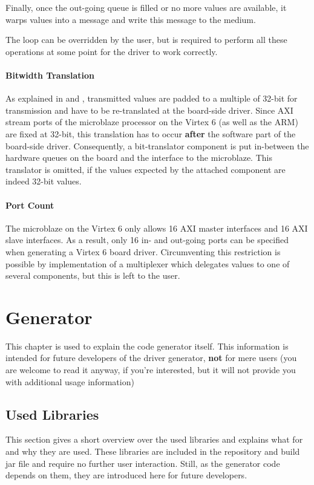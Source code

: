 \documentclass{report}
\begin{document}
Finally, once the out-going queue is filled or no more values are available, it warps values into a message and write this message to the medium.

The loop can be overridden by the user, but is required to perform all these operations at some point for the driver to work correctly.

\subsubsection{Bitwidth Translation}
As explained in  and , transmitted values are padded to a multiple of 32-bit for transmission and have to be re-translated at the board-side driver.
Since AXI stream ports of the microblaze processor on the Virtex 6 (as well as the ARM) are fixed at 32-bit, this translation has to occur \textbf{after} the software part of the board-side driver. Consequently, a bit-translator component is put in-between the hardware queues on the board and the interface to the microblaze. This translator is omitted, if the values expected by the attached component are indeed 32-bit values.

\subsubsection{Port Count}
The microblaze on the Virtex 6 only allows 16 AXI master interfaces and 16 AXI slave interfaces. As a result, only 16 in- and out-going ports can be specified when generating a Virtex 6 board driver. Circumventing this restriction is possible by implementation of a multiplexer which delegates values to one of several components, but this is left to the user.


\chapter{Generator}
This chapter is used to explain the code generator itself. This information is intended for future developers of the driver generator, \textbf{not} for mere users (you are welcome to read it anyway, if you're interested, but it will not provide you with additional usage information)

\section{Used Libraries}
This section gives a short overview over the used libraries and explains what for and why they are used. These libraries are included in the repository and build jar file and require no further user interaction. Still, as the generator code depends on them, they are introduced here for future developers.
\end{document}
